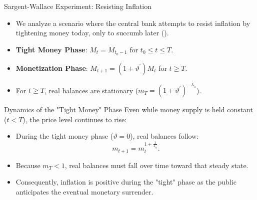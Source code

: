 \documentclass[11pt,aspectratio=169]{beamer}
\begin{document}
\begin{frame}{Sargent-Wallace Experiment: Resisting Inflation}
\small

\begin{itemize}
\item We analyze a scenario where the central bank attempts to resist inflation by tightening money today, only to succumb later (\cite{sargent1981}).
    \item \textbf{Tight Money Phase}: $M_t = M_{t_0-1}$ for $t_0 \leq t \leq T$.
    \item \textbf{Monetization Phase}: $M_{t+1} = (1+\vartheta^{\prime})M_t$ for $t \geq T$.
    \item For $t \geq T$, real balances are stationary ($m_T = (1+\vartheta^{\prime})^{-\lambda_\pi}$).
\end{itemize}
\end{frame}

\begin{frame}{Dynamics of the "Tight Money" Phase}
\small
Even while money supply is held constant ($t < T$), the price level continues to rise:

\begin{itemize}
    \item During the tight money phase ($\vartheta = 0$), real balances follow:
    \begin{equation}
    m_{t+1}=m_{t}^{1+\frac{1}{\lambda _{\pi }}}. \label{eq: Rm1}
    \end{equation}
    \item Because $m_T<1$, real balances must fall over time toward that steady state.
    \item Consequently, inflation is positive during the "tight" phase as the public anticipates the eventual monetary surrender.
\end{itemize}
\end{frame}
\end{document}

